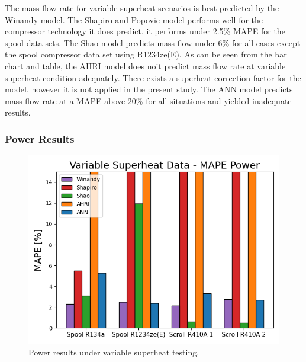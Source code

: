\documentclass[preprint,11pt,authoryear]{elsarticle}
\begin{document}
\begin{table}[h]
\caption{Mass flow rate results for variable superheat scenarios.}
\label{Tab:vspr_mdot_results}
\begin{center}
\end{center}
\end{table}

The mass flow rate for variable superheat scenarios is best predicted by the Winandy model. The Shapiro and Popovic model performs well for the compressor technology it does predict, it performs under 2.5\% MAPE for the spool data sets. The Shao model predicts mass flow under 6\% for all cases except the spool compressor data set using R1234ze(E). As can be seen from the bar chart and table, the AHRI model does noit predict mass flow rate at variable superheat condition adequately. There exists a superheat correction factor for the model, however it is not applied in the present study. The ANN model predicts mass flow rate at a MAPE above 20\% for all situations and yielded inadequate results.  

\subsubsection{Power Results}
\begin{figure}
\centering
\includegraphics[width=0.7\linewidth]{power_vspr.png}
\caption{Power results under variable superheat testing.}
\label{fig:power_vspr}
\end{figure}
\FloatBarrier
\end{document}
